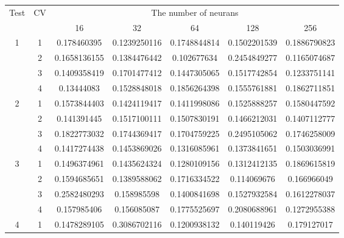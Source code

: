 \documentclass[draft,dvipsnames]{drexel-thesis}
\begin{document}
\begin{thesis}
\begin{table}[!t]
\begin{tabular}{|c|c|c|c|c|c|c|}
\multirow{2}{*}{Test} & \multirow{2}{*}{CV} & \multicolumn{5}{c|}{The number of neurans}                                   \\ \cline{3-7}
                      &                     & 16            & 32            & 64            & 128           & 256          \\ \hline
\multirow{4}{*}{1}    & 1                   & 0.178460395   & 0.1239250116  & 0.1748844814  & 0.1502201539  & 0.1886790823 \\ \cline{2-7}
                      & 2                   & 0.1658136155  & 0.1384476442  & 0.102677634   & 0.2454849277  & 0.1165074687 \\ \cline{2-7}
                      & 3                   & 0.1409358419  & 0.1701477412  & 0.1447305065  & 0.1517742854  & 0.1233751141 \\ \cline{2-7}
                      & 4                   & 0.13444083    & 0.1528848018  & 0.1856264398  & 0.1555761881  & 0.1862711851 \\ \hline
\multirow{4}{*}{2}    & 1                   & 0.1573844403  & 0.1424119417  & 0.1411998086  & 0.1525888257  & 0.1580447592 \\ \cline{2-7}
                      & 2                   & 0.141391445   & 0.1517100111  & 0.1507830191  & 0.1466212031  & 0.1407112777 \\ \cline{2-7}
                      & 3                   & 0.1822773032  & 0.1744369417  & 0.1704759225  & 0.2495105062  & 0.1746258009 \\ \cline{2-7}
                      & 4                   & 0.1417274438  & 0.1453869026  & 0.1316085961  & 0.1373841651  & 0.1503036991 \\ \hline
\multirow{4}{*}{3}    & 1                   & 0.1496374961  & 0.1435624324  & 0.1280109156  & 0.1312412135  & 0.1869615819 \\ \cline{2-7}
                      & 2                   & 0.1594685651  & 0.1389588062  & 0.1716334522  & 0.114069676   & 0.166966049  \\ \cline{2-7}
                      & 3                   & 0.2582480293  & 0.158985598   & 0.1400841698  & 0.1527932584  & 0.1612278037 \\ \cline{2-7}
                      & 4                   & 0.157985406   & 0.156085087   & 0.1775525697  & 0.2080688961  & 0.1272955388 \\ \hline
\multirow{4}{*}{4}    & 1                   & 0.1478289105  & 0.3086702116  & 0.1200938132  & 0.140119426   & 0.179127017  \\ \cline{2-7}

\end{tabular}
\end{table}
\end{thesis}
\end{document}
